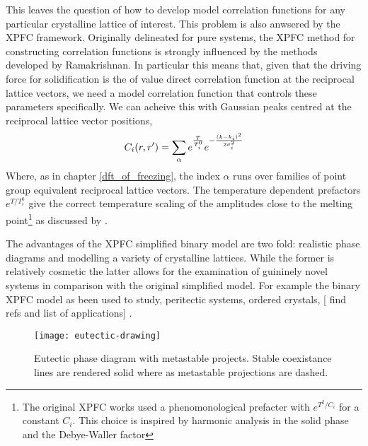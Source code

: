 This leaves the question of how to develop model correlation functions for any
particular crystalline lattice of interest. This problem is also anwsered by
the XPFC framework. Originally delineated for pure systems, the XPFC method for
constructing correlation functions is strongly influenced by the methods
developed by Ramakrishnan. In particular this means that, given that the
driving force for solidification is the of value direct correlation function at
the reciprocal lattice vectors, we need a model correlation function that
controls these parameters specifically. We can acheive this with Gaussian peaks
centred at the reciprocal lattice vector positions,
%
\begin{equation}
    C_i(r, r^\prime) = \sum_{\alpha} e^{\frac{T}{T_i^0}}
        e^{ - \frac{(k - k_i)^2}{2\sigma_i^2}}
\end{equation}
%
Where, as in chapter \ref{dft_of_freezing}, the index $\alpha$ runs over
families of point group equivalent reciprocal lattice vectors. The temperature
dependent prefactors $e^{T / T_i^0}$ give the correct temperature scaling of
the amplitudes close to the melting point\footnote{The original XPFC works used
a phenomonological prefacter with $e^{T^2 / C_i}$ for a constant $C_i$. This
choice is inspired by harmonic analysis in the solid phase and the Debye-Waller
factor} as discussed by \cite{ALSTER17}.

The advantages of the XPFC simplified binary model are two fold: realistic 
phase diagrams and modelling a variety of crystalline lattices. While the
former is relatively cosmetic the latter allows for the examination of 
guininely novel systems in comparison with the original simplified model. For
example the binary XPFC model as been used to study, peritectic systems, 
ordered crystals, [{\color{ForestGreen} find refs and list of applications}]
\cite{GREENWOOD11, ALSTER17}. 

\begin{figure}
    \centering
    \texttt{[image: eutectic-drawing]}
    \caption[Eutectic Phase Diagram with Metastable Projections]{
        \label{fig:eutectic_drawing} Eutectic phase diagram with metastable
        projects. Stable coexistance lines are rendered solid where as 
        metastable projections are dashed.
    }
\end{figure}

